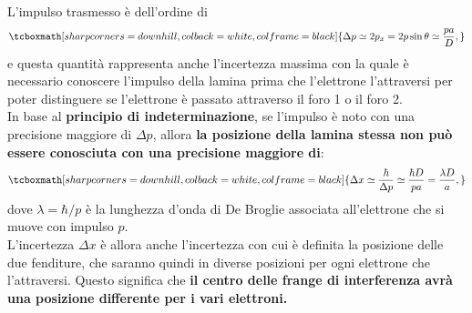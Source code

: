 \documentclass[a4paper,12pt,oneside]{book}
\begin{document}
L'impulso trasmesso è dell'ordine di
	\begin{equation}
		\tcboxmath[sharp corners=downhill, colback=white, colframe=black]{
		\Delta p \simeq 2p_x = 2p \sin \theta \simeq \frac{pa}{D},
		}
	\end{equation}
e questa quantità rappresenta anche l'incertezza massima con la quale è necessario conoscere l'impulso della lamina prima che l'elettrone l'attraversi per poter distinguere se l'elettrone è passato attraverso il foro 1 o il foro 2.\\
In base al \textbf{principio di indeterminazione}, se l'impulso è noto con una precisione maggiore di $\Delta  p$, allora \textbf{la posizione della lamina stessa non può essere conosciuta con una precisione maggiore di}:
	\begin{equation}
		\tcboxmath[sharp corners=downhill, colback=white, colframe=black]{
		\Delta x \simeq \frac{\hbar}{\Delta p} \simeq \frac{\hbar D}{pa}= \frac{\lambda D}{a},
		}
	\end{equation}
dove $\lambda = \hbar / p$ è la lunghezza d'onda di De Broglie associata all'elettrone che si muove con impulso $p$.\\

L'incertezza $\Delta x$ è allora anche l'incertezza con cui è definita la posizione delle due fenditure, che saranno quindi in diverse posizioni per ogni elettrone che l'attraversi. Questo significa che \textbf{il centro delle frange di interferenza avrà una posizione differente per i vari elettroni.}\\
\end{document}
